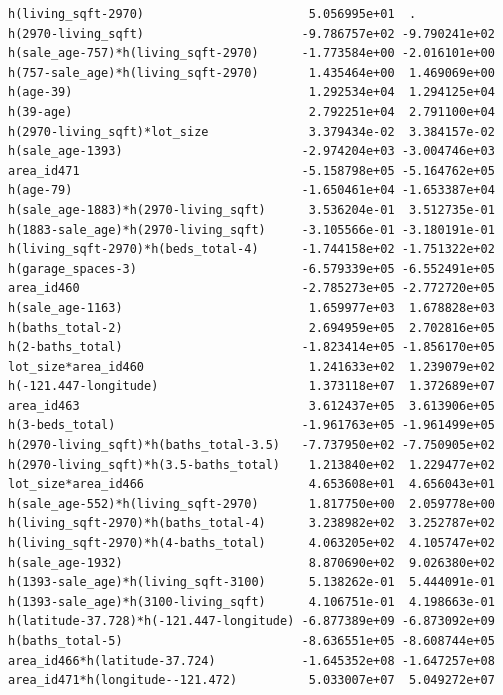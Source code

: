 \documentclass[
]{article}
\begin{document}
\begin{verbatim}
h(living_sqft-2970)                       5.056995e+01  .           
h(2970-living_sqft)                      -9.786757e+02 -9.790241e+02
h(sale_age-757)*h(living_sqft-2970)      -1.773584e+00 -2.016101e+00
h(757-sale_age)*h(living_sqft-2970)       1.435464e+00  1.469069e+00
h(age-39)                                 1.292534e+04  1.294125e+04
h(39-age)                                 2.792251e+04  2.791100e+04
h(2970-living_sqft)*lot_size              3.379434e-02  3.384157e-02
h(sale_age-1393)                         -2.974204e+03 -3.004746e+03
area_id471                               -5.158798e+05 -5.164762e+05
h(age-79)                                -1.650461e+04 -1.653387e+04
h(sale_age-1883)*h(2970-living_sqft)      3.536204e-01  3.512735e-01
h(1883-sale_age)*h(2970-living_sqft)     -3.105566e-01 -3.180191e-01
h(living_sqft-2970)*h(beds_total-4)      -1.744158e+02 -1.751322e+02
h(garage_spaces-3)                       -6.579339e+05 -6.552491e+05
area_id460                               -2.785273e+05 -2.772720e+05
h(sale_age-1163)                          1.659977e+03  1.678828e+03
h(baths_total-2)                          2.694959e+05  2.702816e+05
h(2-baths_total)                         -1.823414e+05 -1.856170e+05
lot_size*area_id460                       1.241633e+02  1.239079e+02
h(-121.447-longitude)                     1.373118e+07  1.372689e+07
area_id463                                3.612437e+05  3.613906e+05
h(3-beds_total)                          -1.961763e+05 -1.961499e+05
h(2970-living_sqft)*h(baths_total-3.5)   -7.737950e+02 -7.750905e+02
h(2970-living_sqft)*h(3.5-baths_total)    1.213840e+02  1.229477e+02
lot_size*area_id466                       4.653608e+01  4.656043e+01
h(sale_age-552)*h(living_sqft-2970)       1.817750e+00  2.059778e+00
h(living_sqft-2970)*h(baths_total-4)      3.238982e+02  3.252787e+02
h(living_sqft-2970)*h(4-baths_total)      4.063205e+02  4.105747e+02
h(sale_age-1932)                          8.870690e+02  9.026380e+02
h(1393-sale_age)*h(living_sqft-3100)      5.138262e-01  5.444091e-01
h(1393-sale_age)*h(3100-living_sqft)      4.106751e-01  4.198663e-01
h(latitude-37.728)*h(-121.447-longitude) -6.877389e+09 -6.873092e+09
h(baths_total-5)                         -8.636551e+05 -8.608744e+05
area_id466*h(latitude-37.724)            -1.645352e+08 -1.647257e+08
area_id471*h(longitude--121.472)          5.033007e+07  5.049272e+07
                                                                    

\end{verbatim}
\end{document}
